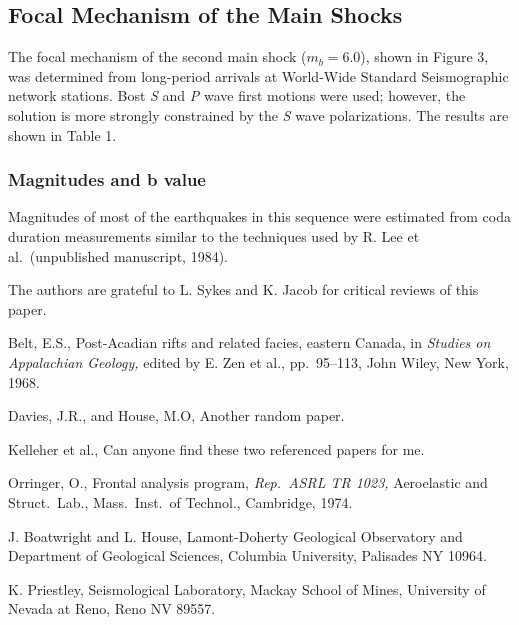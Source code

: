 \subsection{Focal Mechanism of the Main Shocks}
The focal mechanism of the second main shock ($m_b = 6.0$), shown in
Figure 3, was determined from long-period arrivals at World-Wide
Standard Seismographic network stations.  Bost {\em S\/} and {\em P\/}
wave first motions were used; however, the solution is more strongly
constrained by the {\em S\/} wave polarizations.  The results are
shown in Table 1.

\subsubsection{Magnitudes and b value}
Magnitudes of most of the earthquakes in this sequence were estimated
from coda duration measurements similar to the techniques used by R.
Lee et al.\ (unpublished manuscript, 1984).

\begin{acknowledgments}
The authors are grateful to L. Sykes and K. Jacob for critical reviews
of this paper.
\end{acknowledgments}

\begin{thebibliography}{}

Belt, E.S., Post-Acadian rifts and related facies, eastern Canada, in 
{\em Studies on Appalachian Geology,} edited by E. Zen et al.,
pp.~95--113, John Wiley, New York, 1968.

Davies, J.R., and House, M.O, Another random paper.

Kelleher et al., Can anyone find these two referenced papers for me.

Orringer, O., Frontal analysis program, {\em Rep.\ ASRL TR 1023,}
Aeroelastic and Struct.\ Lab., Mass.\ Inst.\ of Technol., Cambridge, 1974.
\end{thebibliography}

\begin{addresses}
J. Boatwright and L. House, Lamont-Doherty Geological Observatory and
Department of Geological Sciences, Columbia University, Palisades NY
10964.

K. Priestley, Seismological Laboratory, Mackay School of Mines,
University of Nevada at Reno, Reno NV 89557.
\end{addresses}

